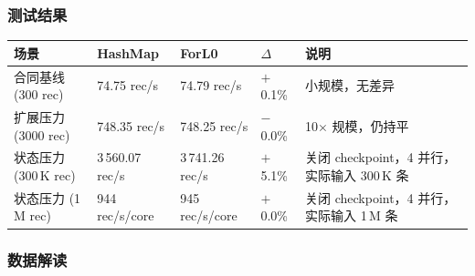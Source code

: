 \documentclass[a4paper,11pt]{article}
\begin{document}
\subsubsection{测试结果}

\begin{table}[H]
\centering
\small
\begin{tabularx}{\textwidth}{L{3.2cm} R{2.5cm} R{2.5cm} R{1.5cm} X}
\toprule
\textbf{场景} & \textbf{HashMap} & \textbf{ForL0} & $\Delta$ & \textbf{说明} \\
\midrule
合同基线 (300 rec) & 74.75 rec/s & 74.79 rec/s & $+$0.1\% & 小规模，无差异 \\
扩展压力 (3000 rec) & 748.35 rec/s & 748.25 rec/s & $-$0.0\% & 10$\times$ 规模，仍持平 \\
状态压力 (300\,K rec) & 3\,560.07 rec/s & 3\,741.26 rec/s & $+$5.1\% & 关闭 checkpoint，4 并行，实际输入 300\,K 条 \\
状态压力 (1\,M rec) & 944 rec/s/core & 945 rec/s/core & $+$0.0\% & 关闭 checkpoint，4 并行，实际输入 1\,M 条 \\
\bottomrule
\end{tabularx}
\end{table}

\subsubsection{数据解读}
\end{document}
